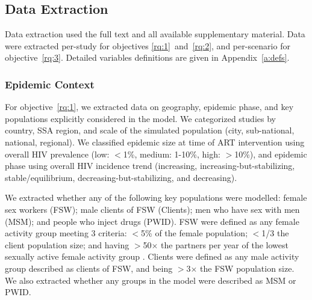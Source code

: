 \subsection{Data Extraction}
\label{ss:meth:data}
Data extraction used the full text and all available supplementary material.
Data were extracted per-study for objectives \ref{rq:1}~and~\ref{rq:2}, and
per-scenario for objective~\ref{rq:3}.
Detailed variables definitions are given in Appendix~\ref{a:defs}.
\subsubsection{Epidemic Context}
\label{sss:meth:context}
For objective~\ref{rq:1}, we extracted data on
geography, epidemic phase, and key populations explicitly considered in the model.
We categorized studies by country, SSA region, and
scale of the simulated population (city, sub-national, national, regional).
We classified epidemic size at time of ART intervention using
overall HIV prevalence (low: $<$1\%, medium: 1-10\%, high: $>$10\%),
and epidemic phase using overall HIV incidence trend
(increasing, increasing-but-stabilizing, stable/equilibrium, decreasing-but-stabilizing, and decreasing).
\par
We extracted whether any of the following key populations were modelled:
female sex workers (FSW);
male clients of FSW (Clients);
men who have sex with men (MSM); and
people who inject drugs (PWID).
FSW were defined as any female activity group meeting 3 criteria:
{$<$5\%} of the female population;
{$<$1/3} the client population size; and
having {$>$50$\times$} the partners per year of
the lowest sexually active female activity group \cite{Vandepitte2006,Scorgie2012}.
Clients were defined as any male activity group
described as clients of FSW, and being {$>$3$\times$} the FSW population size.
We also extracted whether any groups in the model were described as MSM or PWID.
